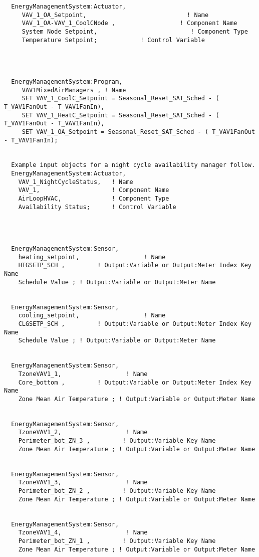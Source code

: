 \begin{lstlisting}
  EnergyManagementSystem:Actuator,
     VAV_1_OA_Setpoint,                            ! Name
     VAV_1_OA-VAV_1_CoolCNode ,                  ! Component Name
     System Node Setpoint,                          ! Component Type
     Temperature Setpoint;            ! Control Variable




  EnergyManagementSystem:Program,
     VAV1MixedAirManagers , ! Name
     SET VAV_1_CoolC_Setpoint = Seasonal_Reset_SAT_Sched - ( T_VAV1FanOut - T_VAV1FanIn),
     SET VAV_1_HeatC_Setpoint = Seasonal_Reset_SAT_Sched - ( T_VAV1FanOut - T_VAV1FanIn),
     SET VAV_1_OA_Setpoint = Seasonal_Reset_SAT_Sched - ( T_VAV1FanOut - T_VAV1FanIn);


  Example input objects for a night cycle availability manager follow.
  EnergyManagementSystem:Actuator,
    VAV_1_NightCycleStatus,   ! Name
    VAV_1,                    ! Component Name
    AirLoopHVAC,              ! Component Type
    Availability Status;      ! Control Variable




  EnergyManagementSystem:Sensor,
    heating_setpoint,                  ! Name
    HTGSETP_SCH ,         ! Output:Variable or Output:Meter Index Key Name
    Schedule Value ; ! Output:Variable or Output:Meter Name


  EnergyManagementSystem:Sensor,
    cooling_setpoint,                  ! Name
    CLGSETP_SCH ,         ! Output:Variable or Output:Meter Index Key Name
    Schedule Value ; ! Output:Variable or Output:Meter Name


  EnergyManagementSystem:Sensor,
    TzoneVAV1_1,                  ! Name
    Core_bottom ,         ! Output:Variable or Output:Meter Index Key Name
    Zone Mean Air Temperature ; ! Output:Variable or Output:Meter Name


  EnergyManagementSystem:Sensor,
    TzoneVAV1_2,                  ! Name
    Perimeter_bot_ZN_3 ,         ! Output:Variable Key Name
    Zone Mean Air Temperature ; ! Output:Variable or Output:Meter Name


  EnergyManagementSystem:Sensor,
    TzoneVAV1_3,                  ! Name
    Perimeter_bot_ZN_2 ,         ! Output:Variable Key Name
    Zone Mean Air Temperature ; ! Output:Variable or Output:Meter Name


  EnergyManagementSystem:Sensor,
    TzoneVAV1_4,                  ! Name
    Perimeter_bot_ZN_1 ,         ! Output:Variable Key Name
    Zone Mean Air Temperature ; ! Output:Variable or Output:Meter Name



\end{lstlisting}
